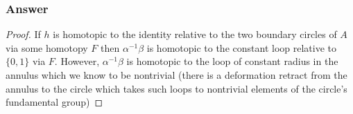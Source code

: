 \documentclass[10pt]{article}
\begin{document}
\subsubsection{Answer}
\begin{proof}
If $h$ is homotopic to the identity relative to the two boundary circles of $A$ via some homotopy $F$ then $\alpha^{-1} \beta$ is homotopic to the constant loop relative to $\{0,1\}$ via $F$. However, $\alpha^{-1}\beta$ is homotopic to the loop of constant radius in the annulus which we know to be nontrivial (there is a deformation retract from the annulus to the circle which takes such loops to nontrivial elements of the circle's fundamental group)
\end{proof}
\end{document}
